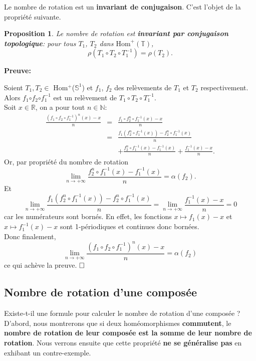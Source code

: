 \documentclass[11pt,a4 paper]{article}
\newtheorem{propriete}[theoreme]{Proposition}
\newcommand{\Tbb}{\mathbb{T}}
\newenvironment{ppt}{\begin{box_ppt}\begin{propriete}}{\end{propriete}\end{box_ppt}}
\begin{document}
Le nombre de rotation est un \textbf{invariant de conjugaison}. C'est l'objet de la propriété suivante.






\begin{ppt}\label{conjugaison}
		Le nombre de rotation est \textbf{invariant par conjugaison topologique}: pour tous $T_1$, $T_2$ dans $\mathrm{Hom}^+(\Tbb)$,
			$$\rho(T_{1}\circ T_{2}\circ T_{1}^{-1})=\rho(T_{2}).$$
\end{ppt}

\textbf{Preuve:}
	\par Soient $T_{1}, T_{2} \in$ Hom$^+$($\mathbb{S}^{1}$) et $f_{1}$, $f_{2}$ des relèvements de $T_{1}$ et $T_{2}$ respectivement.\\
	Alors $f_{1}$$\circ$$f_{2}$$\circ$$f_{1}^{-1}$ est un relèvement de $T_{1}\circ T_{2}\circ T_{1}^{-1}$.\\
	Soit $x \in \mathbb{R}$, on a pour tout $n \in \mathbb{N}$:
	\begin{eqnarray*}
		\frac{(f_{1}\circ f_2 \circ f_1^{-1})^n(x)-x}{n} &=& \frac{f_{1}\circ f_2^n \circ f_1^{-1}(x)-x}{n}\\
		&=& \frac{f_1(f_2^n\circ f_1^{-1}(x)) - f_2^n\circ f_1^{-1}(x)}{n}\\
		 &&+ \frac{f_2^n\circ f_1^{-1}(x) - f_1^{-1}(x)}{n}+ \frac{f_1^{-1}(x) - x}{n}.
	\end{eqnarray*}
	Or, par propriété du nombre de rotation $$\underset{n \to +\infty}{\lim}\frac{f_2^n\circ f_1^{-1}(x) - f_1^{-1}(x)}{n} = \alpha(f_2).$$
	Et  $$\underset{n \to +\infty}{\lim} \frac{f_1(f_2^n\circ f_1^{-1}(x)) - f_2^n\circ f_1^{-1}(x)}{n} = \underset{n \to +\infty}{\lim} \frac{f_1^{-1}(x) - x}{n} = 0$$ car les numérateurs sont bornés. En effet, les fonctions $x \mapsto f_1(x)-x$ et $x\mapsto f_1^{-1}(x)-x$ sont 1-périodiques et continues donc bornées.\\
	Donc finalement, $$\underset{n \to +\infty}{\lim} 	\frac{(f_{1}\circ f_2 \circ f_1^{-1})^n(x)-x}{n} =\alpha(f_2)$$ ce qui achève la preuve. $\hfill \square$








\subsection{Nombre de rotation d'une composée}
Existe-t-il une formule pour calculer le nombre de rotation d'une composée ? D'abord, nous montrerons que si deux homéomorphismes \textbf{commutent}, le \textbf{nombre de rotation de leur composée est la somme de leur nombre de rotation}. Nous verrons ensuite que cette propriété \textbf{ne se généralise pas} en exhibant un contre-exemple.
\end{document}
